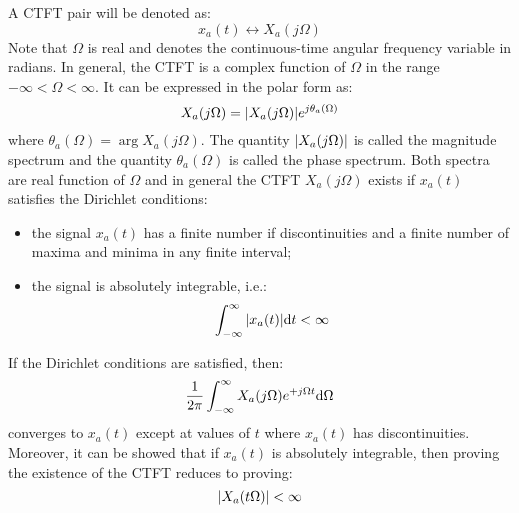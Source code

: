 \documentclass[../../main/main.tex]{subfiles}
\begin{document}
A CTFT pair will be denoted as:
\begin{equation}
    x_{a}(t)
    \longleftrightarrow
    X_{a}(j\Omega)
    \label{eq:L08_S04_2}
\end{equation}
Note that \( \Omega \) is real and denotes the continuous-time angular frequency variable in radians. In general, the CTFT is a complex function of \( \Omega \) in the range \( -\infty < \Omega < \infty \). It can be expressed in the polar form as:
\begin{equation}
    X_{a}(j\Omega)
    =
    \abs{X_{a}(j\Omega)} e^{j\theta_{a}(\Omega)}
    \label{eq:L08_S05_1}
\end{equation}
where \( \theta_{a}(\Omega) = \arg{X_{a}(j\Omega)} \). The quantity \( \abs{X_{a}(j\Omega)} \) is called the magnitude spectrum and the quantity \( \theta_{a}(\Omega) \) is called the phase spectrum. Both spectra are real function of \( \Omega \) and in general the CTFT \( X_{a}(j\Omega) \) exists if \( x_{a}(t) \) satisfies the Dirichlet conditions:
\begin{itemize}
    \item the signal \( x_a(t) \) has a finite number if discontinuities and a finite number of maxima and minima in any finite interval;
    \item the signal is absolutely integrable, i.e.:
    \begin{equation}
        \int_{-\infty}^{\infty} \abs{x_{a}(t)} \mathrm{d}{t}
        <
        \infty
        \label{eq:L08_S07_1}
    \end{equation}
\end{itemize}
If the Dirichlet conditions are satisfied, then:
\begin{equation}
    \frac{1}{2\pi} \int_{-\infty}^{\infty} X_{a}(j\Omega) e^{+j\Omega t} \mathrm{d}{\Omega}
    \label{eq:L08_S08_1}
\end{equation}
converges to \( x_{a}(t) \) except at values of \( t \) where \( x_{a}(t) \) has discontinuities. Moreover, it can be showed that if \( x_{a}(t) \) is absolutely integrable, then proving the existence of the CTFT reduces to proving:
\begin{equation}
    \abs{X_{a}(t\Omega)}
    <
    \infty
    \label{eq:L08_S08_2}
\end{equation}
\end{document}
